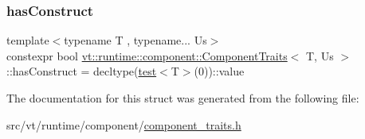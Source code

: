 \subsubsection{\texorpdfstring{has\+Construct}{hasConstruct}}
{\footnotesize\ttfamily template$<$typename T , typename... Us$>$ \\
constexpr bool \hyperlink{structvt_1_1runtime_1_1component_1_1_component_traits}{vt\+::runtime\+::component\+::\+Component\+Traits}$<$ T, Us $>$\+::has\+Construct = decltype(\hyperlink{structvt_1_1runtime_1_1component_1_1_component_traits_ae584f4350bc47282eb63d96c5120f81b}{test}$<$T$>$(0))\+::value\hspace{0.3cm}{\ttfamily [static]}}



The documentation for this struct was generated from the following file\+:\begin{DoxyCompactItemize}
\item 
src/vt/runtime/component/\hyperlink{component__traits_8h}{component\+\_\+traits.\+h}\end{DoxyCompactItemize}

